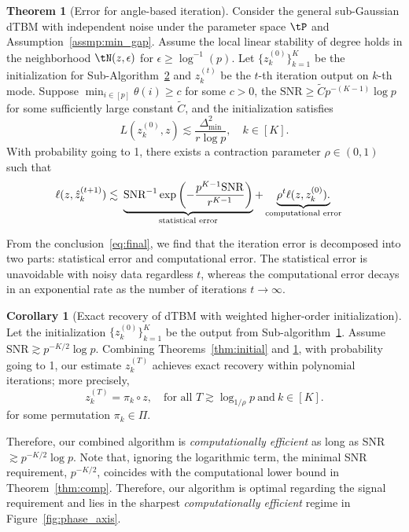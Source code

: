\documentclass[lettersize,onecolumn,journal]{IEEEtran}
\theoremstyle{definition}
\newtheorem{thm}{Theorem}
\newtheorem{cor}{Corollary}
\theoremstyle{definition}
\newcommand{\of}[1]{\left(#1\right)}
\newcommand*{\KeepStyleUnderBrace}[1]{%
  \mathop{%
    \mathchoice
    {\underbrace{\displaystyle#1}}%
    {\underbrace{\textstyle#1}}%
    {\underbrace{\scriptstyle#1}}%
    {\underbrace{\scriptscriptstyle#1}}%
  }\limits
}
\def\fixme#1#2{\textbf{\color{red}[FIXME (#1): #2]}}
\begin{document}
{
  


\begin{thm}[Error for angle-based iteration]\label{thm:refinement} Consider the general sub-Gaussian dTBM with independent noise under the parameter space $\tP$ and Assumption~\ref{assmp:min_gap}. Assume the local linear stability of degree holds in the neighborhood $\tN(z, \epsilon)$ for $\epsilon \geq \log^{-1}(p)$. Let $\{z^{(0)}_k\}_{k=1}^K$ be the initialization for Sub-Algorithm~\hyperref[alg:main]{2} and $z^{(t)}_k$ be the $t$-th iteration output on $k$-th mode. Suppose $\min_{i \in [p]}\theta(i) \geq c $ for some $c > 0$, the $\text{SNR} \geq \tilde C p^{-(K-1)}\log p$ for some sufficiently large constant $\tilde C$, and the initialization satisfies 
\begin{equation}
    L(z^{(0)}_k, z) \lesssim \frac{\Delta_{\min}^2}{r \log p}, \quad k \in [K].
\end{equation}
 With probability going to 1, there exists a contraction parameter $\rho \in (0,1)$ such that 
\begin{align}\label{eq:final}
    \ell(z, \hat z^{(t+1)}_k) \lesssim &\ \KeepStyleUnderBrace{
   \text{SNR}^{-1}
    \exp\of{- \frac{p^{K-1}\text{SNR}}{r^{K-1}}}}_{\substack{\text{statistical error}} }+ \KeepStyleUnderBrace{ \rho^t \ell(z, z^{(0)}_k). }_{\substack{\text{computational error}}}
\end{align}
\end{thm}
From the conclusion~\eqref{eq:final}, we find that the iteration error is decomposed into two parts: statistical error and computational error. The statistical error is unavoidable with noisy data regardless $t$, whereas the computational error decays in an exponential rate as the number of iterations $t \rightarrow \infty$. 


\begin{cor}[Exact recovery of dTBM with weighted higher-order initialization]  Let the initialization $\{z^{(0)}_k\}_{k = 1}^K$ be the output from Sub-algorithm~\hyperref[alg:main]{1}. Assume $\text{SNR} \gtrsim p^{-K/2} \log p$. Combining Theorems~\ref{thm:initial} and \ref{thm:refinement}, with probability going to 1, our estimate $z^{(T)}_k$ achieves exact recovery within polynomial iterations; more precisely,
\begin{equation}
     z^{(T)}_k = \pi_k \circ z, \quad \text{for all }T\gtrsim \log_{1/\rho} p\  \text{and}\ k \in [K ].
\end{equation}
for some permutation $\pi_k \in \Pi$. 
\end{cor}
Therefore, our combined algorithm is \textit{computationally efficient} as long as SNR $\gtrsim p^{-K/2} \log p$. Note that, ignoring the logarithmic term, the minimal SNR requirement, $p^{-K/2}$, coincides with the computational lower bound in Theorem~\ref{thm:comp}. Therefore, our algorithm is optimal regarding the signal requirement and lies in the sharpest \emph{computationally efficient} regime in Figure~\ref{fig:phase_axis}. 

}
\end{document}
